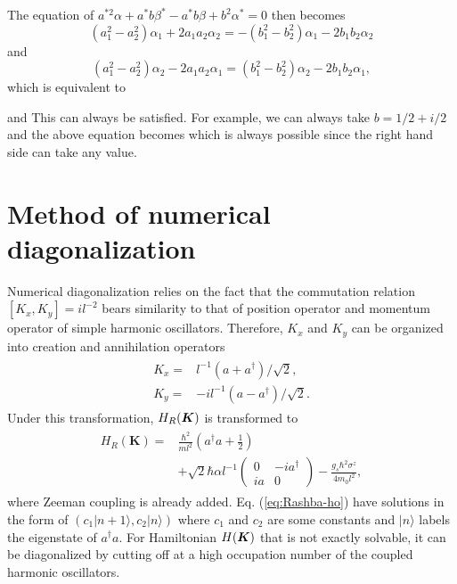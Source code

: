 \documentclass[aps, prb, showpacs, twocolumn, notitlepage, superscriptaddress]{revtex4-1}
\begin{document}
The equation of $a^{*2}\alpha+a^{*}b\beta^{*}-a^{*}b\beta+b^{2}\alpha^{*}=0$ then becomes
\begin{equation}
(a_{1}^{2}-a_{2}^{2})\alpha_{1}+2a_{1}a_{2}\alpha_{2}=-(b_{1}^{2}-b_{2}^{2})\alpha_{1}-2b_{1}b_{2}\alpha_{2}
\end{equation}
and 
\begin{equation}
    (a_{1}^{2}-a_{2}^{2})\alpha_{2}-2a_{1}a_{2}\alpha_{1}=(b_{1}^{2}-b_{2}^{2})\alpha_{2}-2b_{1}b_{2}\alpha_{1},
\end{equation}
which is equivalent to 

and 
This can always be satisfied. For example, we can always take $b=1/2+i/2$
and the above equation becomes
which is always possible since the right hand side  can take any value.


\section{Method of numerical diagonalization}\label{sec:numerical}

Numerical diagonalization relies on the fact that the commutation relation $[K_x,K_y]=il^{-2}$ bears similarity to that of position operator and momentum operator of simple harmonic oscillators. Therefore, $K_x$ and $K_y$ can be organized into creation and annihilation operators
\begin{align}
\begin{split}
K_x=&l^{-1}(a+a^\dagger)/\sqrt{2},\\
K_y=&-il^{-1}(a-a^\dagger)/\sqrt{2}.
\end{split}
\end{align}
Under this transformation, $H_R(\boldsymbol{K})$ is transformed to
\begin{align}
\begin{split}
H_{R}(\boldsymbol{K})=&\frac{\hbar^2}{ml^2}(a^{\dagger}a+\frac{1}{2})
\\&+\sqrt{2}\hbar\alpha l^{-1}\left(\begin{array}{cc}
0 & -ia^{\dagger}\\
ia & 0
\end{array}\right)
-\frac{g_s\hbar^2\sigma^z}{4m_0l^2},
\end{split}\label{eq:Rashba-ho}
\end{align}
where Zeeman coupling is already added. Eq. (\ref{eq:Rashba-ho}) have solutions in the form of $(c_1|n+1\rangle,c_2|n\rangle)$ where $c_1$ and $c_2$ are some constants and $|n\rangle$ labels the eigenstate of $a^\dagger a$. For Hamiltonian $H(\boldsymbol{K})$ that is not exactly solvable, it can be diagonalized by cutting off at a high occupation number of the coupled harmonic oscillators.
\end{document}
